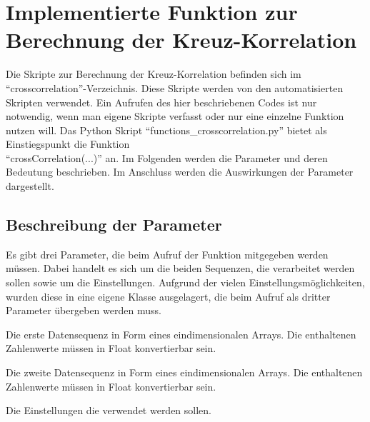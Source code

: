 \chapter{Implementierte Funktion zur Berechnung der Kreuz-Korrelation}
\label{chp:crosscorrelation:implementation}
Die Skripte zur Berechnung der Kreuz-Korrelation befinden sich im \enquote{crosscorrelation}-Verzeichnis.
Diese Skripte werden von den automatisierten Skripten verwendet.
Ein Aufrufen des hier beschriebenen Codes ist nur notwendig, wenn man eigene Skripte verfasst oder nur eine einzelne Funktion nutzen will.
Das Python Skript \enquote{functions\_crosscorrelation.py} bietet als Einstiegspunkt die Funktion\\ \mbox{\enquote{crossCorrelation(...)}} an. Im Folgenden werden die Parameter und deren Bedeutung beschrieben.
Im Anschluss werden die Auswirkungen der Parameter dargestellt.

\section{Beschreibung der Parameter}

Es gibt drei Parameter, die beim Aufruf der Funktion mitgegeben werden müssen. Dabei handelt es sich um die beiden Sequenzen, die verarbeitet werden sollen sowie um die Einstellungen. Aufgrund der vielen Einstellungsmöglichkeiten, wurden diese in eine eigene Klasse ausgelagert, die beim Aufruf als dritter Parameter übergeben werden muss.
\begin{description}[style=nextline]
\item[seqA] Die erste Datensequenz in Form eines eindimensionalen Arrays. Die enthaltenen Zahlenwerte müssen in Float konvertierbar sein.
\item[seqB] Die zweite Datensequenz in Form eines eindimensionalen Arrays. Die enthaltenen Zahlenwerte müssen in Float konvertierbar sein.
\item[settings] Die Einstellungen die verwendet werden sollen. 
\end{description}


